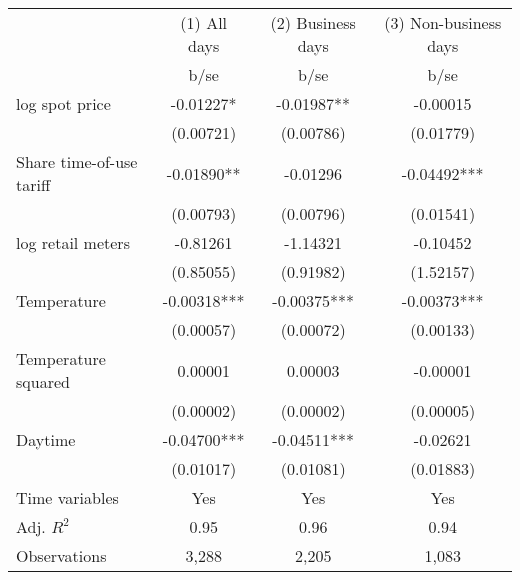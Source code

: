 \begin{tabular}{lccc}\toprule
                    &(1) All days   &(2) Business days   &(3) Non-business days   \\
                    &        b/se   &        b/se   &        b/se   \\
\midrule
log spot price      &    -0.01227*  &    -0.01987** &    -0.00015   \\
                    &   (0.00721)   &   (0.00786)   &   (0.01779)   \\
Share time-of-use tariff&    -0.01890** &    -0.01296   &    -0.04492***\\
                    &   (0.00793)   &   (0.00796)   &   (0.01541)   \\
log retail meters   &    -0.81261   &    -1.14321   &    -0.10452   \\
                    &   (0.85055)   &   (0.91982)   &   (1.52157)   \\
Temperature         &    -0.00318***&    -0.00375***&    -0.00373***\\
                    &   (0.00057)   &   (0.00072)   &   (0.00133)   \\
Temperature squared &     0.00001   &     0.00003   &    -0.00001   \\
                    &   (0.00002)   &   (0.00002)   &   (0.00005)   \\
Daytime             &    -0.04700***&    -0.04511***&    -0.02621   \\
                    &   (0.01017)   &   (0.01081)   &   (0.01883)   \\
Time variables      &         Yes   &         Yes   &         Yes   \\
\midrule
Adj. \(R^2\)        &        0.95   &        0.96   &        0.94   \\
Observations        &       3,288   &       2,205   &       1,083   \\
\bottomrule\end{tabular}
